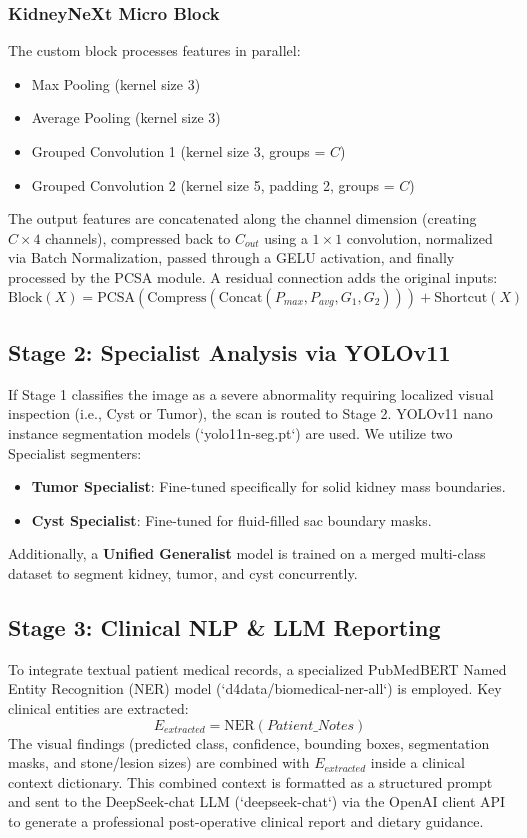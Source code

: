 \documentclass[preprint,12pt]{elsarticle}
\begin{document}
\subsubsection{KidneyNeXt Micro Block}
The custom block processes features in parallel:
\begin{itemize}
    \item Max Pooling (kernel size 3)
    \item Average Pooling (kernel size 3)
    \item Grouped Convolution 1 (kernel size 3, groups = $C$)
    \item Grouped Convolution 2 (kernel size 5, padding 2, groups = $C$)
\end{itemize}
The output features are concatenated along the channel dimension (creating $C \times 4$ channels), compressed back to $C_{out}$ using a $1 \times 1$ convolution, normalized via Batch Normalization, passed through a GELU activation, and finally processed by the PCSA module. A residual connection adds the original inputs:
\begin{equation}
    \text{Block}(X) = \text{PCSA}(\text{Compress}(\text{Concat}(P_{max}, P_{avg}, G_1, G_2))) + \text{Shortcut}(X)
\end{equation}

\subsection{Stage 2: Specialist Analysis via YOLOv11}
If Stage 1 classifies the image as a severe abnormality requiring localized visual inspection (i.e., Cyst or Tumor), the scan is routed to Stage 2. YOLOv11 nano instance segmentation models (`yolo11n-seg.pt`) are used. We utilize two Specialist segmenters:
\begin{itemize}
    \item \textbf{Tumor Specialist}: Fine-tuned specifically for solid kidney mass boundaries.
    \item \textbf{Cyst Specialist}: Fine-tuned for fluid-filled sac boundary masks.
\end{itemize}
Additionally, a \textbf{Unified Generalist} model is trained on a merged multi-class dataset to segment kidney, tumor, and cyst concurrently.

\subsection{Stage 3: Clinical NLP \& LLM Reporting}
To integrate textual patient medical records, a specialized PubMedBERT Named Entity Recognition (NER) model (`d4data/biomedical-ner-all`) is employed. Key clinical entities are extracted:
\begin{equation}
    E_{extracted} = \text{NER}(Patient\_Notes)
\end{equation}
The visual findings (predicted class, confidence, bounding boxes, segmentation masks, and stone/lesion sizes) are combined with $E_{extracted}$ inside a clinical context dictionary. This combined context is formatted as a structured prompt and sent to the DeepSeek-chat LLM (`deepseek-chat`) via the OpenAI client API to generate a professional post-operative clinical report and dietary guidance.
\end{document}
